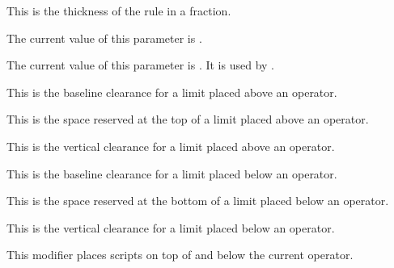 \startnewprimitive[title={\prm {Umathfractionrule}}]

This is the thickness of the rule in a fraction.

\stopnewprimitive

\startnewprimitive[title={\prm {Umathfractionvariant}}]

The current value of this parameter is \CurrentMathVariant \Umathfractionvariant.

\stopnewprimitive

\startnewprimitive[title={\prm {Umathhextensiblevariant}}]

The current value of this parameter is \CurrentMathVariant
\Umathhextensiblevariant. It is used by .

\stopnewprimitive

\startnewprimitive[title={\prm {Umathlimitabovebgap}}]

This is the baseline clearance for a limit placed above an operator.

\stopnewprimitive

\startnewprimitive[title={\prm {Umathlimitabovekern}}]

This is the space reserved at the top of a limit placed above an operator.

\stopnewprimitive

\startnewprimitive[title={\prm {Umathlimitabovevgap}}]

This is the vertical clearance for a limit placed above an operator.

\stopnewprimitive

\startnewprimitive[title={\prm {Umathlimitbelowbgap}}]

This is the baseline clearance for a limit placed below an operator.

\stopnewprimitive

\startnewprimitive[title={\prm {Umathlimitbelowkern}}]

This is the space reserved at the bottom of a limit placed below an operator.

\stopnewprimitive

\startnewprimitive[title={\prm {Umathlimitbelowvgap}}]

This is the vertical clearance for a limit placed below an operator.

\stopnewprimitive

\startnewprimitive[title={\prm {Umathlimits}}]

This modifier places scripts on top of and below the current operator.

